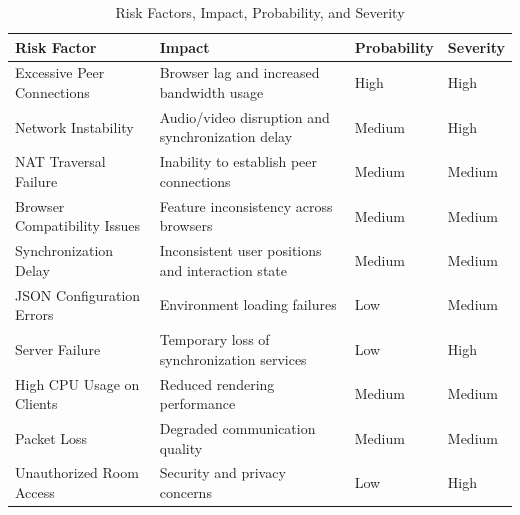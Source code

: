 \documentclass[12pt]{article}
\begin{document}
\begin{table}[h!]
\centering
\renewcommand{\arraystretch}{1.5}
\begin{tabular}{|p{4.5cm}|p{5.5cm}|p{2.5cm}|p{2.5cm}|}
\hline
\textbf{Risk Factor} & \textbf{Impact} & \textbf{Probability} & \textbf{Severity} \\ 
\hline

Excessive Peer Connections & Browser lag and increased bandwidth usage & High & High \\ 
\hline

Network Instability & Audio/video disruption and synchronization delay & Medium & High \\ 
\hline

NAT Traversal Failure & Inability to establish peer connections & Medium & Medium \\ 
\hline

Browser Compatibility Issues & Feature inconsistency across browsers & Medium & Medium \\ 
\hline

Synchronization Delay & Inconsistent user positions and interaction state & Medium & Medium \\ 
\hline

JSON Configuration Errors & Environment loading failures & Low & Medium \\ 
\hline

Server Failure & Temporary loss of synchronization services & Low & High \\ 
\hline

High CPU Usage on Clients & Reduced rendering performance & Medium & Medium \\ 
\hline

Packet Loss & Degraded communication quality & Medium & Medium \\ 
\hline

Unauthorized Room Access & Security and privacy concerns & Low & High \\ 
\hline

\end{tabular}
\caption{Risk Factors, Impact, Probability, and Severity}
\end{table}
\end{document}
